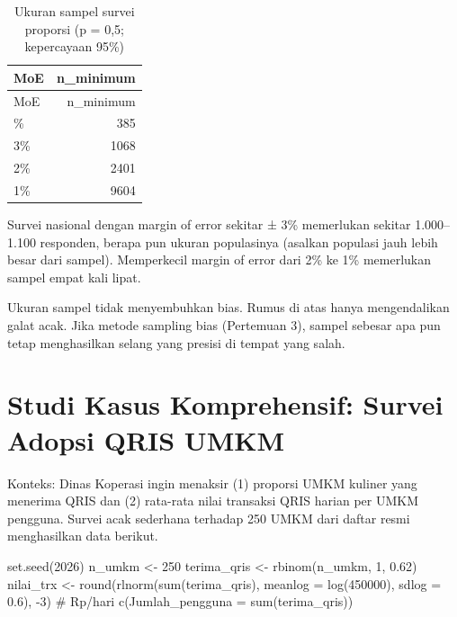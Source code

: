 \documentclass[
  indonesian,
  letterpaper,
]{book}
\newenvironment{Shaded}{\begin{snugshade}}{\end{snugshade}}
\newcommand{\AttributeTok}[1]{\textcolor[rgb]{0.40,0.45,0.13}{#1}}
\newcommand{\CommentTok}[1]{\textcolor[rgb]{0.37,0.37,0.37}{#1}}
\newcommand{\DecValTok}[1]{\textcolor[rgb]{0.68,0.00,0.00}{#1}}
\newcommand{\FloatTok}[1]{\textcolor[rgb]{0.68,0.00,0.00}{#1}}
\newcommand{\FunctionTok}[1]{\textcolor[rgb]{0.28,0.35,0.67}{#1}}
\newcommand{\NormalTok}[1]{\textcolor[rgb]{0.00,0.23,0.31}{#1}}
\newcommand{\OtherTok}[1]{\textcolor[rgb]{0.00,0.23,0.31}{#1}}
\newcommand{\SpecialCharTok}[1]{\textcolor[rgb]{0.37,0.37,0.37}{#1}}
\begin{document}
\begin{longtable}[]{@{}lr@{}}
\caption{Ukuran sampel survei proporsi (p = 0,5; kepercayaan
95\%)}\tabularnewline
\toprule\noalign{}
MoE & n\_minimum \\
\midrule\noalign{}
\endfirsthead
\toprule\noalign{}
MoE & n\_minimum \\
\midrule\noalign{}
\endhead
\bottomrule\noalign{}
\endlastfoot
5\% & 385 \\
3\% & 1068 \\
2\% & 2401 \\
1\% & 9604 \\
\end{longtable}

Survei nasional dengan margin of error sekitar ± 3\% memerlukan sekitar
1.000--1.100 responden, berapa pun ukuran populasinya (asalkan populasi
jauh lebih besar dari sampel). Memperkecil margin of error dari 2\% ke
1\% memerlukan sampel empat kali lipat.

Ukuran sampel tidak menyembuhkan bias. Rumus di atas hanya mengendalikan
galat acak. Jika metode sampling bias (Pertemuan 3), sampel sebesar apa
pun tetap menghasilkan selang yang presisi di tempat yang salah.


\chapter{Studi Kasus Komprehensif: Survei Adopsi QRIS
UMKM}\label{studi-kasus-komprehensif-survei-adopsi-qris-umkm}

Konteks: Dinas Koperasi ingin menaksir (1) proporsi UMKM kuliner yang
menerima QRIS dan (2) rata-rata nilai transaksi QRIS harian per UMKM
pengguna. Survei acak sederhana terhadap 250 UMKM dari daftar resmi
menghasilkan data berikut.

\begin{Shaded}
\begin{Highlighting}[]
\FunctionTok{set.seed}\NormalTok{(}\DecValTok{2026}\NormalTok{)}
\NormalTok{n\_umkm }\OtherTok{\textless{}{-}} \DecValTok{250}
\NormalTok{terima\_qris }\OtherTok{\textless{}{-}} \FunctionTok{rbinom}\NormalTok{(n\_umkm, }\DecValTok{1}\NormalTok{, }\FloatTok{0.62}\NormalTok{)}
\NormalTok{nilai\_trx }\OtherTok{\textless{}{-}} \FunctionTok{round}\NormalTok{(}\FunctionTok{rlnorm}\NormalTok{(}\FunctionTok{sum}\NormalTok{(terima\_qris), }\AttributeTok{meanlog =} \FunctionTok{log}\NormalTok{(}\DecValTok{450000}\NormalTok{), }\AttributeTok{sdlog =} \FloatTok{0.6}\NormalTok{), }\SpecialCharTok{{-}}\DecValTok{3}\NormalTok{) }\CommentTok{\# Rp/hari}
\FunctionTok{c}\NormalTok{(}\AttributeTok{Jumlah\_pengguna =} \FunctionTok{sum}\NormalTok{(terima\_qris))}
\end{Highlighting}
\end{Shaded}
\end{document}
